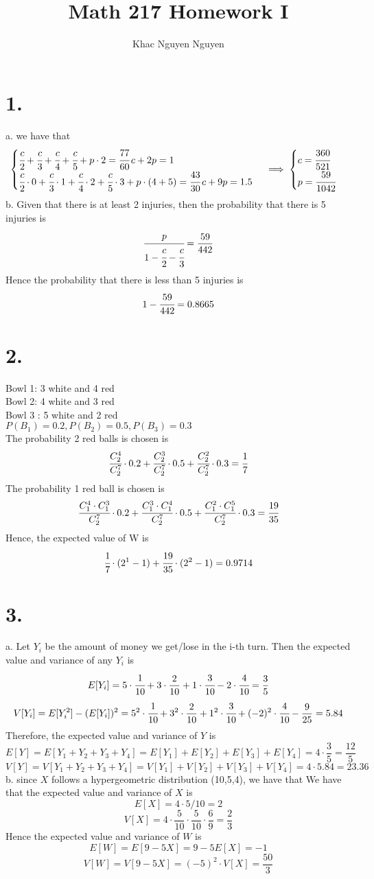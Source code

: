 \documentclass[11pt]{article}
\title{\textbf{Math 217 Homework I}}
\author{Khac Nguyen Nguyen}
\date{}
\begin{document}
\section*{1.}
a.
we have that 
\[
\begin{cases}
\cfrac{c}{2} + \cfrac{c}{3} + \cfrac{c}{4} + \cfrac{c}{5} + p \cdot 2 = \cfrac{77}{60} \, c + 2p = 1 \\
\cfrac{c}{2} \cdot 0 + \cfrac{c}{3} \cdot 1 + \cfrac{c}{4} \cdot 2 + \cfrac{c}{5} \cdot 3 + p \cdot (4+5) = \cfrac{43}{30} \, c + 9p =1.5
\end{cases}
\implies \begin{cases}
c = \cfrac{360}{521} \\
p = \cfrac{59}{1042}\\
\end{cases}
\]
b.
Given that there is at least 2 injuries, then the probability that there is 5 injuries is 
\[
\cfrac{p}{1-\cfrac{c}{2}-\cfrac{c}{3}} = \frac{59}{442}
\]
Hence the probability that there is less than 5 injuries is
\[
1 - \cfrac{59}{442} = 0.8665
\]
\pagebreak
\section*{2.}
Bowl 1: 3 white and 4 red \\
Bowl 2: 4 white and 3 red \\
Bowl 3 : 5 white and 2 red \\
$P(B_1) = 0.2, P(B_2) = 0.5, P(B_3) = 0.3$ \\
The probability 2 red balls is chosen is
\[
\cfrac{C^4_2}{C^7_2} \cdot 0.2 + \cfrac{C^3_2}{C^7_2} \cdot 0.5 + \cfrac{C^2_2}{C^7_2} \cdot 0.3 = \cfrac{1}{7} 
\]
The probability 1 red ball is chosen is 
\[
\cfrac{C^4_1 \cdot C^3_1}{C^7_2} \cdot 0.2 + \cfrac{C^3_1 \cdot C^4_1}{C^7_2} \cdot 0.5 + \cfrac{C^2_1 \cdot C^5_1}{C^7_2} \cdot 0.3 = \cfrac{19}{35} 
\]
Hence, the expected value of W is
\[
\cfrac{1}{7} \cdot (2^1-1) + \cfrac{19}{35} \cdot (2^2-1) = 0.9714
\]
\pagebreak
\section*{3.}
a.
Let $Y_i$ be the amount of money we get/lose in the i-th turn. Then the expected value and variance of any $Y_i$ is 
\[
E[Y_i] = 5 \cdot \cfrac{1}{10} + 3 \cdot \frac{2}{10} + 1 \cdot \cfrac{3}{10} - 2 \cdot \cfrac{4}{10} = \frac{3}{5}
\]
\[
V[Y_i] = E[Y_i^2] - (E[Y_i])^2 =  5^2 \cdot \cfrac{1}{10} + 3^2 \cdot \frac{2}{10} + 1^2 \cdot \cfrac{3}{10} + (-2)^2 \cdot \cfrac{4}{10} - \frac{9}{25} = 5.84
\]
Therefore, the expected value and variance of $Y$ is 
\[
E[Y] = E[Y_1+Y_2+Y_3+Y_4] = E[Y_1] + E[Y_2] + E[Y_3] + E[Y_4] = 4 \cdot \frac{3}{5} = \frac{12}{5}
\]
\[
V[Y] =  V[Y_1+Y_2+Y_3+Y_4] =  V[Y_1] + V[Y_2] + V[Y_3] + V[Y_4] = 4 \cdot 5.84 = 23.36
\]
b. since $X$ follows a hypergeometric distribution (10,5,4), we have that 
We have that the expected value and variance of $X$ is
\[
E[X] = 4 \cdot 5 / 10 = 2
\]
\[
V[X] = 4 \cdot \frac{5}{10} \cdot \frac{5}{10} \cdot \frac{6}{9} = \frac{2}{3}
\]
Hence the expected value and variance of $W$ is 
\[
E[W] = E[9-5X] = 9 - 5E[X] = -1
\]
\[
V[W] = V[9-5X] = (-5)^2 \cdot V[X] = \frac{50}{3}
\]
\pagebreak
\end{document}
